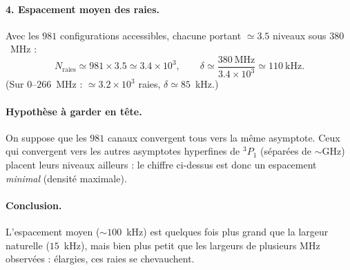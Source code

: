 \documentclass[11pt]{article}
\begin{document}
\paragraph{4. Espacement moyen des raies.}
Avec les $981$ configurations accessibles, chacune portant $\simeq3.5$ niveaux sous $380$~MHz :
\[
N_{\text{raies}} \simeq 981\times3.5 \simeq 3.4\times10^3,
\qquad
\delta \simeq \frac{380~\text{MHz}}{3.4\times10^3} \simeq 110~\text{kHz}.
\]
(Sur $0$--$266$~MHz : $\simeq 3.2\times10^3$ raies, $\delta\simeq 85$~kHz.)

\paragraph{Hypothèse à garder en tête.} On suppose que les $981$ canaux convergent tous vers la même asymptote.
Ceux qui convergent vers les autres asymptotes hyperfines de $^3P_1$ (séparées de $\sim$GHz) placent leurs niveaux ailleurs :
le chiffre ci-dessus est donc un espacement \emph{minimal} (densité maximale).

\paragraph{Conclusion.} L'espacement moyen ($\sim100$~kHz) est quelques fois plus grand que la largeur naturelle ($15$~kHz),
mais bien plus petit que les largeurs de plusieurs MHz observées : élargies, ces raies se chevauchent.
\end{document}
